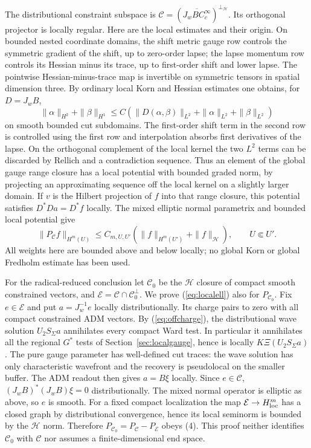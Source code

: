 \documentclass[11pt]{article}
\begin{document}
The distributional constraint subspace is
$\mathcal C=(\overline{J_w B C_c^\infty})^{\perp_{\mathcal H}}$.
Its orthogonal projector is locally regular. Here are the local
estimates and their origin. On bounded nested coordinate domains,
the shift metric gauge row controls the symmetric gradient of the
shift, up to zero-order lapse; the lapse momentum row controls its
Hessian minus its trace, up to first-order shift and lower lapse.
The pointwise Hessian-minus-trace map is invertible on symmetric
tensors in spatial dimension three. By ordinary local Korn and
Hessian estimates one obtains, for $D=J_wB$,
\[
 \|\alpha\|_{H^2}+\|\beta\|_{H^1}
       \le C(\|D(\alpha,\beta)\|_{L^2}+\|\alpha\|_{L^2}+\|\beta\|_{L^2})
\]
on smooth bounded cut subdomains. The first-order shift term in
the second row is controlled using the first row and interpolation
absorbs first derivatives of the lapse. On the orthogonal complement
of the local kernel the two $L^2$ terms can be discarded by Rellich
and a contradiction sequence. Thus an element of the global gauge
range closure has a local potential with bounded graded norm, by
projecting an approximating sequence off the local kernel on a
slightly larger domain. If $v$ is the Hilbert projection of $f$ into
that range closure, this potential satisfies $D^*D a=D^*f$ locally.
The mixed elliptic normal parametrix and bounded local potential give
\begin{equation}
 \|P_{\mathcal C}f\|_{H^m(U)}
 \le C_{m,U,U'}(\|f\|_{H^m(U')}+\|f\|_{\mathcal H}),
 \qquad U\Subset U'.                                      \label{eq:localell}
\end{equation}
All weights here are bounded above and below locally; no global Korn
or global Fredholm estimate has been used.

For the radical-reduced conclusion let $\mathcal C_0$ be the
$\mathcal H$ closure of compact smooth constrained vectors, and
$\mathcal E=\mathcal C\cap\mathcal C_0^\perp$. We prove
(\ref{eq:localell}) also for $P_{\mathcal C_0}$. Fix
$e\in\mathcal E$ and put $a=J_w^{-1}e$ locally distributionally.
Its charge pairs to zero with all compact constrained ADM vectors.
By (\ref{eq:offcharge}), the distributional wave solution
$U_2 S_\Sigma a$ annihilates every compact Ward test. In particular
it annihilates all the regional $G^*$ tests of
Section~\ref{sec:localgauge}, hence is locally $K\Xi (U_2 S_\Sigma a)$.
The pure gauge parameter has well-defined cut traces: the wave
solution has only characteristic wavefront and the recovery is
pseudolocal on the smaller buffer. The ADM readout then gives
$a=B\xi$ locally. Since $e\in\mathcal C$,
$(J_wB)^*(J_wB)\xi=0$ distributionally. The mixed normal
operator is elliptic as above, so $e$ is smooth. For a fixed compact
localization the map $\mathcal E\to H^m_{\rm loc}$ has a closed
graph by distributional convergence, hence its local seminorm is
bounded by the $\mathcal H$ norm. Therefore
$P_{\mathcal C_0}=P_{\mathcal C}-P_{\mathcal E}$ obeys (4).
This proof neither identifies $\mathcal C_0$ with $\mathcal C$
nor assumes a finite-dimensional end space.
\end{document}
